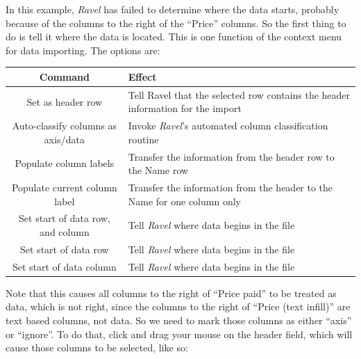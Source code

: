 In this example, \emph{Ravel} has failed to determine where the data
starts, probably because of the columns to the right of the ``Price''
columns. So the first thing to do is tell it where the data is located.
This is one function of the context menu for data importing. The options
are:

\noindent\begin{tabular}{|c|p{}|}
\hline 
Command & Effect\tabularnewline
\hline 
\hline 
Set as header row & Tell Ravel that the selected row contains the header information for
the import\tabularnewline
\hline 
Auto-classify columns as axis/data & Invoke \emph{Ravel}'s automated column classification routine\tabularnewline
\hline 
Populate column labels & Transfer the information from the header row to the Name row\tabularnewline
\hline 
Populate current column label & Transfer the information from the header to the Name for one column
only\tabularnewline
\hline 
Set start of data row, and column & Tell \emph{Ravel }where data begins in the file\tabularnewline
\hline 
Set start of data row & Tell \emph{Ravel} where data begins in the file\tabularnewline
\hline 
Set start of data column & Tell \emph{Ravel} where data begins in the file\tabularnewline
\hline 
\end{tabular}
\begin{center}
\par\end{center}

Note that this causes all columns to the right of ``Price paid''
to be treated as data, which is not right, since the columns to the
right of ``Price (text infill)'' are text based columns, not data.
So we need to mark those columns as either ``axis'' or ``ignore''.
To do that, click and drag your mouse on the header field, which will
cause those columns to be selected, like so:
\begin{center}
\par\end{center}


